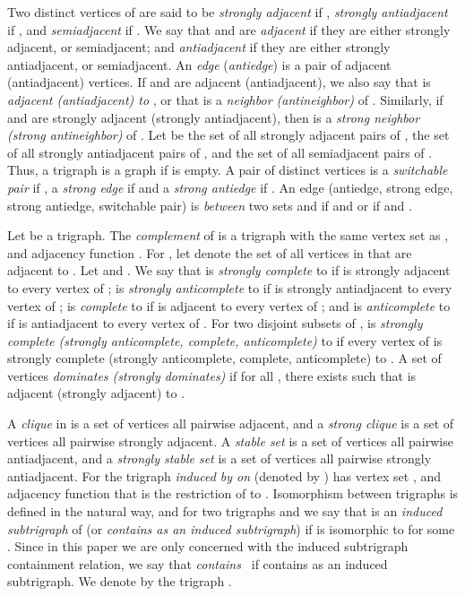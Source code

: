 \documentclass[11 pt] {article}
\begin{document}
Two distinct vertices of  are said to be {\em strongly adjacent} if
, {\em strongly antiadjacent} if , and
{\em semiadjacent} if . We say that  and  are
{\em adjacent} if they are either strongly adjacent, or semiadjacent;
and {\em antiadjacent} if they are either strongly antiadjacent, or
semiadjacent. An \emph{edge} (\emph{antiedge}) is a pair of adjacent
(antiadjacent) vertices. If  and  are adjacent (antiadjacent),
we also say that  is {\em adjacent (antiadjacent) to} , or that
 is a {\em neighbor (antineighbor)} of . Similarly, if  and
 are strongly adjacent (strongly antiadjacent), then  is a {\em
  strong neighbor (strong antineighbor)} of . Let  be the
set of all strongly adjacent pairs of ,  the set of all
strongly antiadjacent pairs of , and  the set of all
semiadjacent pairs of . Thus, a trigraph  is a graph if
 is empty. A pair  of distinct
vertices is a \emph{switchable pair} if , a
\emph{strong edge} if  and a \emph{strong antiedge} if
.  An edge  (antiedge, strong edge, strong
antiedge, switchable pair) is \emph{between} two sets  and  if  and  or if 
and .


Let  be a trigraph. The \emph{complement}  of  is a
trigraph with the same vertex set as , and adjacency function
. For , let  denote the
set of all vertices in  that are adjacent to
. Let  and . We say that  is {\em strongly complete} to
 if  is strongly adjacent to every vertex of ;  is {\em
 strongly anticomplete} to  if  is strongly antiadjacent to
every vertex of ;  is {\em complete} to  if  is adjacent
to every vertex of ; and  is {\em anticomplete} to  if  is
antiadjacent to every vertex of . For two disjoint subsets 
of ,  is {\em strongly complete (strongly anticomplete,
 complete, anticomplete)} to  if every vertex of  is strongly
complete (strongly anticomplete, complete, anticomplete) to . A
set of vertices  \emph{dominates (strongly
 dominates)}  if for all , there exists
 such that  is adjacent (strongly adjacent) to .


A {\em clique} in  is a set of vertices all pairwise adjacent, and
a {\em strong clique} is a set of vertices all pairwise strongly
adjacent. A {\em stable set} is a set of vertices all pairwise
antiadjacent, and a {\em strongly stable set} is a set of vertices all
pairwise strongly antiadjacent. For  the trigraph
{\em induced by  on } (denoted by ) has vertex set ,
and adjacency function that is the restriction of  to . Isomorphism between trigraphs is defined in the natural
way, and for two trigraphs  and  we say that  is an {\em
 induced subtrigraph} of  (or  {\em contains  as an induced
 subtrigraph}) if  is isomorphic to  for some . Since in this paper we are only concerned with the induced subtrigraph
containment relation, we say that \emph{ contains~} if 
contains  as an induced subtrigraph. We denote by 
the trigraph .
\end{document}
